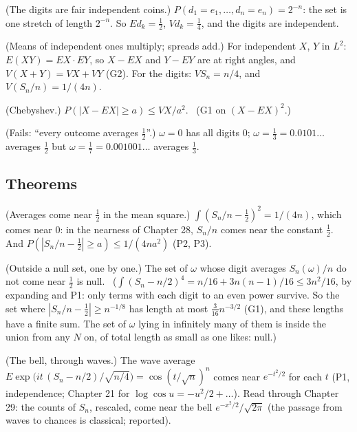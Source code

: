 \begin{lines}
\item[\lab{P1}] (The digits are fair independent coins.) $P(d_1 = e_1, \dots, d_n = e_n) = 2^{-n}$: the set is one stretch of length $2^{-n}$. So $E d_k = \tfrac12$, $V d_k = \tfrac14$, and the digits are independent.
\item[\lab{P2}] (Means of independent ones multiply; spreads add.) For independent $X$, $Y$ in $L^2$: $E(XY) = EX \cdot EY$, so $X - EX$ and $Y - EY$ are at right angles, and $V(X + Y) = VX + VY$ (G2). For the digits: $V S_n = n/4$, and $V(S_n/n) = 1/(4n)$.
\item[\lab{P3}] (Chebyshev.) $P(|X - EX| \ge a) \le VX / a^2$. \ (G1 on $(X - EX)^2$.)
\item[\lab{P4}] (Fails: ``every outcome averages $\tfrac12$''.) $\omega = 0$ has all digits $0$; $\omega = \tfrac13 = 0.0101\ldots$ averages $\tfrac12$ but $\omega = \tfrac17 = 0.001001\ldots$ averages $\tfrac13$.
\end{lines}

\subsection*{Theorems}

\begin{lines}
\item[\lab{T1}] (Averages come near $\tfrac12$ in the mean square.) $\int (S_n/n - \tfrac12)^2 = 1/(4n)$, which comes near $0$: in the nearness of Chapter 28, $S_n/n$ comes near the constant $\tfrac12$. And $P(|S_n/n - \tfrac12| \ge a) \le 1/(4na^2)$ (P2, P3).
\item[\lab{T2}] (Outside a null set, one by one.) The set of $\omega$ whose digit averages $S_n(\omega)/n$ do not come near $\tfrac12$ is null. \ ($\int (S_n - n/2)^4 = n/16 + 3n(n-1)/16 \le 3n^2/16$, by expanding and P1: only terms with each digit to an even power survive. So the set where $|S_n/n - \tfrac12| \ge n^{-1/8}$ has length at most $\tfrac{3}{16} n^{-3/2}$ (G1), and these lengths have a finite sum. The set of $\omega$ lying in infinitely many of them is inside the union from any $N$ on, of total length as small as one likes: null.)
\item[\lab{T3}] (The bell, through waves.) The wave average $E \exp\big(i t\,(S_n - n/2)/\sqrt{n/4}\big) = \cos(t/\sqrt n)^n$ comes near $e^{-t^2/2}$ for each $t$ (P1, independence; Chapter 21 for $\log\cos u = -u^2/2 + \dots$). Read through Chapter 29: the counts of $S_n$, rescaled, come near the bell $e^{-x^2/2}/\sqrt{2\pi}$ (the passage from waves to chances is classical; reported).
\end{lines}

